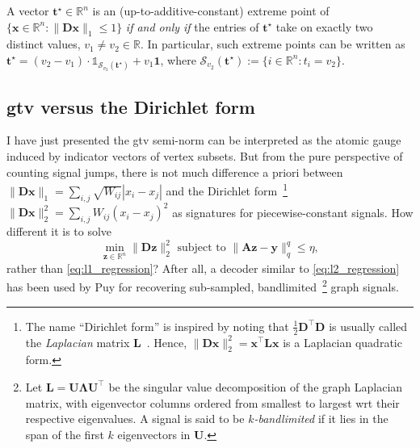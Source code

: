 \begin{proposition}\label{prop:extreme_points_gtv_ball}
    A vector $\mathbf{t}^\star \in \mathbb{R}^{n}$ is an (up-to-additive-constant) extreme point of $\{ \mathbf{x} \in \mathbb{R}^{n} : \| \mathbf{Dx} \|_1 \leq 1\}$ \emph{if and only if} the entries of $\mathbf{t}^\star$ take on exactly two distinct values, $v_1 \neq v_2 \in \mathbb{R}$. In particular, such extreme points can be written as $\mathbf{t}^\star = (v_2 - v_1) \cdot \mathbb{1}_{\mathcal{S}_{v_2}(\mathbf{t}^\star)} + v_1 \mathbf{1}$, where $\mathcal{S}_{v_2}(\mathbf{t}^\star) := \{ i \in \mathbb{R}^{n} : t_i = v_2\}$.
\end{proposition}


\subsection{\texorpdfstring{\acrlong{gtv}}{Graph Total Variation} versus the Dirichlet form}\label{sec:gtv_versus_dirichlet}

I have just presented the \acrshort{gtv} semi-norm can be interpreted as the atomic gauge induced by indicator vectors of vertex subsets. But from the pure perspective of counting signal jumps, there is not much difference a priori between $\| \mathbf{Dx}\|_1 = \sum_{i,j} \sqrt{W_{ij}} |x_i - x_j|$ and the Dirichlet form~\footnote{The name ``Dirichlet form'' is inspired by noting that $\frac{1}{2}\mathbf{D}^\top \mathbf{D}$ is usually called the \emph{Laplacian} matrix $\mathbf{L}$~\cite{shuman2013}. Hence, $\|\mathbf{Dx}\|_2^2 = \mathbf{x}^{\top} \mathbf{L} \mathbf{x}$ is a Laplacian quadratic form.} $\|\mathbf{Dx}\|_2^2 = \sum_{i,j} W_{ij} (x_i - x_j)^{2}$ as signatures for piecewise-constant signals. How different it is to solve
\begin{equation}\label{eq:l2_regression}
    \underset{\mathbf{z} \in \mathbb{R}^{n}}{\min} \| \mathbf{Dz} \|_2^2 \text{ subject to } \| \mathbf{Az - y} \|_q^q \leq \eta,
\end{equation}
rather than \eqref{eq:l1_regression}? After all, a decoder similar to \eqref{eq:l2_regression} has been used by Puy \etal \cite{puy2016} for recovering sub-sampled, bandlimited~\footnote{Let $\mathbf{L} = \mathbf{U} \bm{\Lambda} \mathbf{U}^\top$ be the singular value decomposition of the graph Laplacian matrix, with eigenvector columns ordered from smallest to largest \acrshort{wrt} their respective eigenvalues. A signal is said to be \emph{$k$-bandlimited} if it lies in the span of the first $k$ eigenvectors in $\mathbf{U}$.} graph signals.

